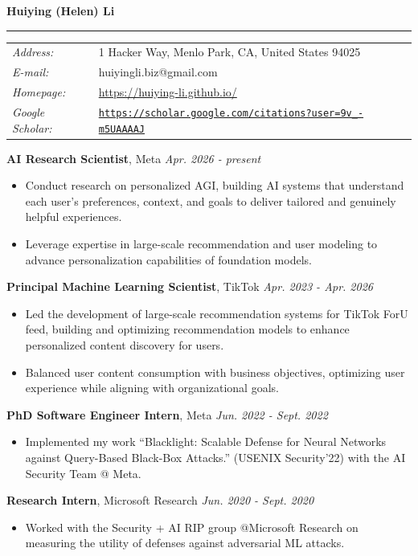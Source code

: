 \documentclass[10pt,letterpaper]{article}
\newenvironment{cvsec}[1]{\par\vspace{10pt}\begin{list}{}{\setlength{\leftmargin}{1.15in}\setlength{\labelwidth}{1.1in}\setlength{\labelsep}{0.05in}\setlength{\topsep}{0pt}}\item[{\parbox[t]{1.1in}{\raggedright\textsc{#1}}}]}{\end{list}}
\begin{document}
{\large\textbf{Huiying (Helen) Li}}\\[-6pt]
\rule{\textwidth}{0.6pt}

\begin{cvsec}{Contact\\Information}
\begin{tabular}{@{}p{1.0in}l@{}}
\textit{Address:} & 1 Hacker Way, Menlo Park, CA, United States 94025\\
\textit{E-mail:} & huiyingli.biz@gmail.com\\
\textit{Homepage:} & \url{https://huiying-li.github.io/}\\
\textit{Google Scholar:} & \href{https://scholar.google.com/citations?user=9v_-m5UAAAAJ&hl=en}{\texttt{https://scholar.google.com/citations?user=9v\_-m5UAAAAJ}}
\end{tabular}
\end{cvsec}

\begin{cvsec}{Industry\\Experience}
\textbf{AI Research Scientist}, Meta \hfill \textit{Apr. 2026 - present}
\begin{itemize}
\item Conduct research on personalized AGI, building AI systems that understand each user's preferences, context, and goals to deliver tailored and genuinely helpful experiences.
\item Leverage expertise in large-scale recommendation and user modeling to advance personalization capabilities of foundation models.
\end{itemize}
\vspace{4pt}
\textbf{Principal Machine Learning Scientist}, TikTok \hfill \textit{Apr. 2023 - Apr. 2026}
\begin{itemize}
\item Led the development of large-scale recommendation systems for TikTok ForU feed, building and optimizing recommendation models to enhance personalized content discovery for users.
\item Balanced user content consumption with business objectives, optimizing user experience while aligning with organizational goals.
\end{itemize}
\vspace{4pt}
\textbf{PhD Software Engineer Intern}, Meta \hfill \textit{Jun. 2022 - Sept. 2022}
\begin{itemize}
\item Implemented my work ``Blacklight: Scalable Defense for Neural Networks against Query-Based Black-Box Attacks.'' (USENIX Security'22) with the AI Security Team @ Meta.
\end{itemize}
\vspace{4pt}
\textbf{Research Intern}, Microsoft Research \hfill \textit{Jun. 2020 - Sept. 2020}
\begin{itemize}
\item Worked with the Security + AI RIP group @Microsoft Research on measuring the utility of defenses against adversarial ML attacks.
\end{itemize}
\end{cvsec}
\end{document}
